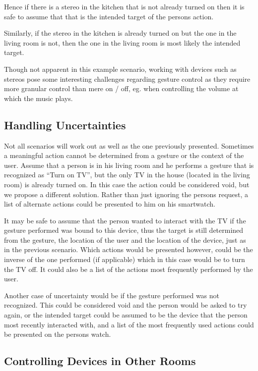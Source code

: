 Hence if there is a stereo in the kitchen that is not already turned on then it is safe to  assume that that is the intended target of the persons action.

Similarly, if the stereo in the kitchen is already turned on but the one in the living room is not, then the one in the living room is most likely the intended target.

Though not apparent in this example scenario, working with devices such as stereos pose some interesting challenges regarding gesture control as they require more granular control than mere on / off, eg. when controlling the volume at which the music plays.

\subsection{Handling Uncertainties}
\label{sec:analysis:scenarios:handling_uncertainties}

Not all scenarios will work out as well as the one previously presented.
Sometimes a meaningful action cannot be determined from a gesture or the context of the user.
Assume that a person is in his living room and he performs a gesture that is recognized as ``Turn on TV'', but the only TV in the house (located in the living room) is already turned on.
In this case the action could be considered void, but we propose a different solution.
Rather than just ignoring the persons request, a list of alternate actions could be presented to him on his smartwatch.

It may be safe to assume that the person wanted to interact with the TV if the gesture performed was bound to this device, thus the target is still determined from the gesture, the location of the user and the location of the device, just as in the previous scenario.
Which actions would be presented however, could be the inverse of the one performed (if applicable) which in this case would be to turn the TV off.
It could also be a list of the actions most frequently performed by the user.

Another case of uncertainty would be if the gesture performed was not recognized.
This could be considered void and the person would be asked to try again, or the intended target could be assumed to be the device that the person most recently interacted with, and a list of the most frequently used actions could be presented on the persons watch.

\subsection{Controlling Devices in Other Rooms}
\label{sec:analysis:scenarios:other_rooms}


